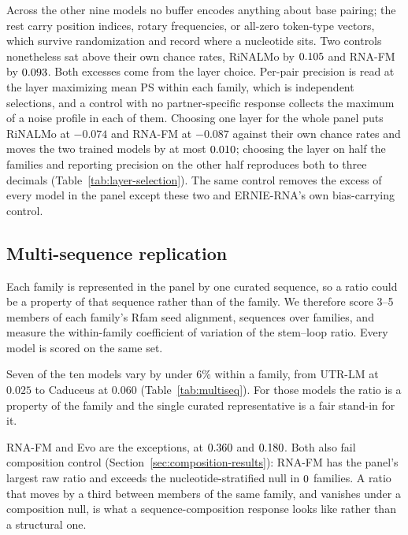 \documentclass[11pt]{article}
\begin{document}
Across the other nine models no buffer encodes anything about base pairing;
the rest carry position indices, rotary frequencies, or all-zero token-type
vectors, which survive randomization and record where a nucleotide sits. Two
controls nonetheless sat above their own chance rates, RiNALMo by
$0.105{}$ and RNA-FM by $0.093{}$. Both excesses come from the layer choice. Per-pair precision
is read at the layer maximizing mean PS within each family, which is
\chanceRateN{} independent selections, and a control with no partner-specific
response collects the maximum of a noise profile in each of them. Choosing one
layer for the whole panel puts RiNALMo at $-0.074$ and RNA-FM at $-0.087$
against their own chance rates and moves the two trained models by at most
$0.010{}$; choosing the layer on half the families and reporting precision on the
other half reproduces both to three decimals
(Table~\ref{tab:layer-selection}). The same control removes the excess of every
model in the panel except these two and ERNIE-RNA's own bias-carrying control.

\subsection{Multi-sequence replication}
\label{sec:multiseq-results}

Each family is represented in the panel by one curated sequence, so a ratio
could be a property of that sequence rather than of the family. We therefore
score 3--5 members of each family's Rfam seed alignment, \multiseqN{} sequences
over \multiseqFamilies{} families, and measure the within-family coefficient of
variation of the stem--loop ratio. Every model is scored on the same set.



Seven of the ten models vary by under 6\% within a family, from UTR-LM at
$0.025$ to Caduceus at $0.060$ (Table~\ref{tab:multiseq}). For those models the
ratio is a property of the family and the single curated representative is a
fair stand-in for it.

RNA-FM and Evo are the exceptions, at $0.360{}$ and $0.180{}$. Both also
fail composition control (Section~\ref{sec:composition-results}): RNA-FM has the
panel's largest raw ratio and exceeds the nucleotide-stratified null in
$0{}$ families. A ratio that moves by a third between members of the
same family, and vanishes under a composition null, is what a
sequence-composition response looks like rather than a structural one.
\end{document}
